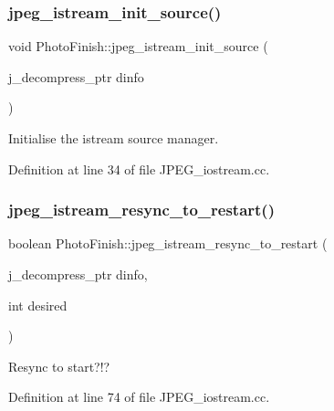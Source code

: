 \subsubsection{\texorpdfstring{jpeg\+\_\+istream\+\_\+init\+\_\+source()}{jpeg\_istream\_init\_source()}}
{\footnotesize\ttfamily void Photo\+Finish\+::jpeg\+\_\+istream\+\_\+init\+\_\+source (\begin{DoxyParamCaption}\item[{j\+\_\+decompress\+\_\+ptr}]{dinfo }\end{DoxyParamCaption})}



Initialise the istream source manager. 



Definition at line 34 of file J\+P\+E\+G\+\_\+iostream.\+cc.

\mbox{\label{namespace_photo_finish_a0a64252810bcf2b15205488328e3e061}} 
\subsubsection{\texorpdfstring{jpeg\+\_\+istream\+\_\+resync\+\_\+to\+\_\+restart()}{jpeg\_istream\_resync\_to\_restart()}}
{\footnotesize\ttfamily boolean Photo\+Finish\+::jpeg\+\_\+istream\+\_\+resync\+\_\+to\+\_\+restart (\begin{DoxyParamCaption}\item[{j\+\_\+decompress\+\_\+ptr}]{dinfo,  }\item[{int}]{desired }\end{DoxyParamCaption})}



Resync to start?!? 



Definition at line 74 of file J\+P\+E\+G\+\_\+iostream.\+cc.

\mbox{\label{namespace_photo_finish_a7662e3a9bb30f7ca698a21e4c092da3c}} 
